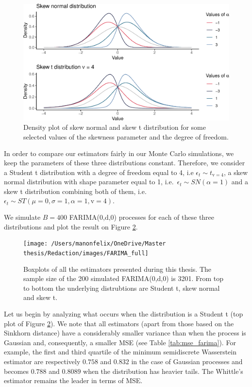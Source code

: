 \documentclass[
  11pt,
]{article}
\begin{document}
\begin{figure}

{\centering \includegraphics[width=0.65\linewidth]{Master_thesis_V5_files/figure-latex/skewt_density-1} 

}

\caption{Density plot of skew normal and skew t distribution for some selected values of the skewness parameter and the degree of freedom.}\label{fig:skewt_density}
\end{figure}

In order to compare our estimators fairly in our Monte Carlo
simulations, we keep the parameters of these three distributions
constant. Therefore, we consider a Student t distribution with a degree
of freedom equal to 4, i.e \(\epsilon_t \sim t_{\mathrm{v} =4}\), a skew
normal distribution with shape parameter equal to 1,
i.e.~\(\epsilon_t \sim SN(\alpha = 1)\) and a skew t distribution
combining both of them,
i.e.~\(\epsilon_t \sim S T(\mu = 0, \sigma = 1, \alpha = 1, \mathrm{v} = 4)\).

We simulate \(B = 400\) FARIMA(0,d,0) processes for each of these three
distributions and plot the result on Figure \ref{fig:box_farima_full}.

\begin{figure}

{\centering \texttt{[image: /Users/manonfelix/OneDrive/Master thesis/Redaction/images/FARIMA\_full]} 

}

\caption{Boxplots of all the estimators presented during this thesis. The sample size of the 200 simulated FARIMA(0,d,0) is 3201. From top to bottom the underlying distrubtions are Student t, skew normal and skew t.}\label{fig:box_farima_full}
\end{figure}

Let us begin by analyzing what occurs when the distribution is a Student
t (top plot of Figure \ref{fig:box_farima_full}). We note that all
estimators (apart from those based on the Sinkhorn distance) have a
considerably smaller variance than when the process is Gaussian and,
consequently, a smaller MSE (see Table \ref{tab:mse_farima}). For
example, the first and third quartile of the minimum semidiscrete
Wasserstein estimator are respectively \(0.758\) and \(0.832\) in the
case of Gaussian processes and becomes \(0.788\) and \(0.8089\) when the
distribution has heavier tails. The Whittle's estimator remains the
leader in terms of MSE.
\end{document}
